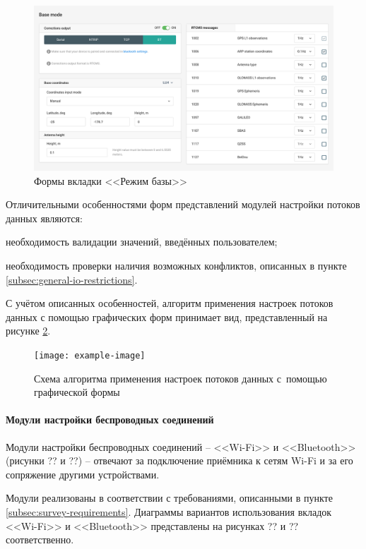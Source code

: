 \begin{figure}[h!]
  \centering
  \setlength{\fboxsep}{5pt}
  \includegraphics[width=.8\textwidth]{img/reachview/base-mode_content_laptop}
  \vspace*{6pt}
  \caption{Формы вкладки <<Режим базы>>}
  \label{fig:base-mode}
\end{figure}

Отличительными особенностями форм представлений модулей настройки потоков данных являются:
\begin{dashitemize}
  \item необходимость валидации значений, введённых пользователем;
  \item необходимость проверки наличия возможных конфликтов, описанных в пункте \ref{subsec:general-io-restrictions}.
\end{dashitemize}

С учётом описанных особенностей, алгоритм применения настроек потоков данных с помощью графических форм принимает вид, представленный на рисунке \ref{fig:io-form-apply}.

\begin{figure}[h!]
  \centering
  \setlength{\fboxsep}{5pt}
  \texttt{[image: example-image]}
  \vspace*{6pt}
  \caption{Схема алгоритма применения настроек потоков данных с~помощью графической формы}
  \label{fig:io-form-apply}
\end{figure}

\paragraph{Модули настройки беспроводных соединений}

Модули настройки беспроводных соединений -- <<Wi-Fi>> и <<Bluetooth>> (рисунки ?? и ??) -- отвечают за подключение приёмника к сетям Wi-Fi и за его сопряжение другими устройствами.

Модули реализованы в соответствии с требованиями, описанными в пункте \ref{subsec:survey-requirements}. Диаграммы вариантов использования вкладок <<Wi-Fi>> и <<Bluetooth>> представлены на рисунках ?? и ?? соответственно.

